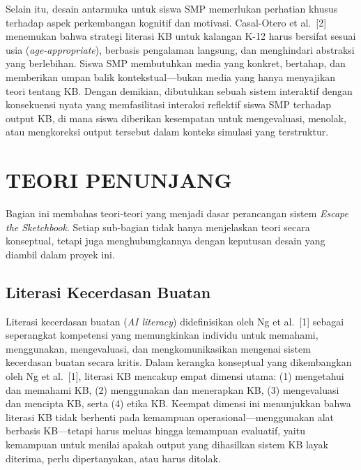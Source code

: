 Selain itu, desain antarmuka untuk siswa SMP memerlukan perhatian khusus terhadap aspek perkembangan kognitif dan motivasi. Casal-Otero et al.\ [2] menemukan bahwa strategi literasi KB untuk kalangan K-12 harus bersifat sesuai usia (\textit{age-appropriate}), berbasis pengalaman langsung, dan menghindari abstraksi yang berlebihan. Siswa SMP membutuhkan media yang konkret, bertahap, dan memberikan umpan balik kontekstual---bukan media yang hanya menyajikan teori tentang KB. Dengan demikian, dibutuhkan sebuah sistem interaktif dengan konsekuensi nyata yang memfasilitasi interaksi reflektif siswa SMP terhadap output KB, di mana siswa diberikan kesempatan untuk mengevaluasi, menolak, atau mengkoreksi output tersebut dalam konteks simulasi yang terstruktur.

\section{TEORI PENUNJANG}
\label{sec:teori-penunjang}

Bagian ini membahas teori-teori yang menjadi dasar perancangan sistem \textit{Escape the Sketchbook}. Setiap sub-bagian tidak hanya menjelaskan teori secara konseptual, tetapi juga menghubungkannya dengan keputusan desain yang diambil dalam proyek ini.

\subsection{Literasi Kecerdasan Buatan}
\label{subsec:literasi-kb}

Literasi kecerdasan buatan (\textit{AI literacy}) didefinisikan oleh Ng et al.\ [1] sebagai seperangkat kompetensi yang memungkinkan individu untuk memahami, menggunakan, mengevaluasi, dan mengkomunikasikan mengenai sistem kecerdasan buatan secara kritis. Dalam kerangka konseptual yang dikembangkan oleh Ng et al.\ [1], literasi KB mencakup empat dimensi utama: (1) mengetahui dan memahami KB, (2) menggunakan dan menerapkan KB, (3) mengevaluasi dan mencipta KB, serta (4) etika KB. Keempat dimensi ini menunjukkan bahwa literasi KB tidak berhenti pada kemampuan operasional---menggunakan alat berbasis KB---tetapi harus meluas hingga kemampuan evaluatif, yaitu kemampuan untuk menilai apakah output yang dihasilkan sistem KB layak diterima, perlu dipertanyakan, atau harus ditolak.


